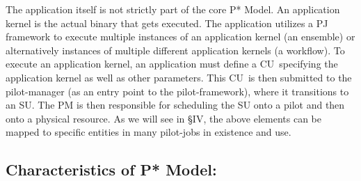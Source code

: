 \documentclass[conference,final]{IEEEtran}
\newcommand{\jhanote}[1]{ {\textcolor{red} { ***shantenu: #1 }}}
\newcommand{\jhanote}[1]{}
\newcommand{\cu}{CU\xspace}
\newcommand{\upp}{\vspace*{-0.5em}}
\begin{document}
The application itself is not strictly part of the core P* Model. %
An application kernel is the actual binary that gets executed.  The
application utilizes a PJ framework to execute multiple instances of
an application kernel (an ensemble) or alternatively instances of
multiple different application kernels (a workflow).  To execute an
application kernel, an application must define a \cu \ specifying the
application kernel as well as other parameters. This \cu \ is then
submitted to the pilot-manager (as an entry point to the
pilot-framework), where it transitions to an SU. The PM is then
responsible for scheduling the SU onto a pilot and then onto a
physical resource.  As we will see in \S{IV}, the above elements can
be mapped to specific entities in many pilot-jobs in existence and
use.

% 
% 


\subsection{Characteristics of P* Model:\upp\upp}
\label{sec:p_star_elements}


 
\end{document}
